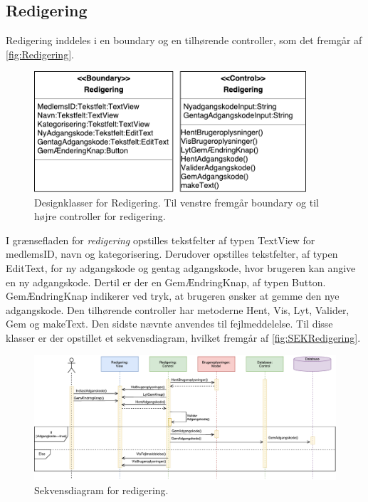\subsection*{Redigering}
Redigering inddeles i en boundary og en tilhørende controller, som det fremgår af \autoref{fig:Redigering}. 

\begin{figure} [H]
\centering
\includegraphics[width=0.9\textwidth]{figures/MVC/Redigering}
\caption{Designklasser for Redigering. Til venstre fremgår boundary og til højre controller for redigering.}
\label{fig:Redigering}
\end{figure}

\noindent
I grænsefladen for \textit{redigering} opstilles tekstfelter af typen TextView for medlemsID, navn og kategorisering. Derudover opstilles tekstfelter, af typen EditText, for ny adgangskode og gentag adgangskode, hvor brugeren kan angive en ny adgangskode. Dertil er der en GemÆndringKnap, af typen Button. GemÆndringKnap indikerer ved tryk, at brugeren ønsker at gemme den nye adgangskode. 
Den tilhørende controller har metoderne Hent, Vis, Lyt, Valider, Gem og makeText. Den sidste nævnte anvendes til fejlmeddelelse. Til disse klasser er der opstillet et sekvensdiagram, hvilket fremgår af \autoref{fig:SEKRedigering}.


\begin{figure} [H]
\centering
\includegraphics[width=1\textwidth]{figures/Sek/SEKRedigering}
\caption{Sekvensdiagram for redigering.}
\label{fig:SEKRedigering}
\end{figure}

